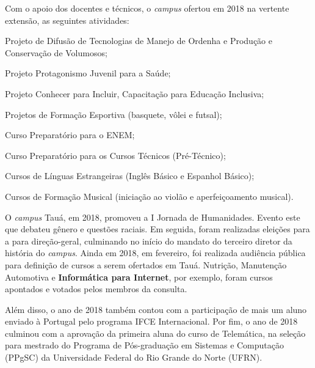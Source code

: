 \documentclass[
	12pt,				%
	openright,			%
	twoside,			%
	a4paper,			%
	chapter=TITLE,		%
	english,			%
	french,				%
	spanish,			%
	brazil,				%
	]{abntex2}
\begin{document}
Com o apoio dos docentes e técnicos, o \textit{campus} ofertou em 2018 na vertente extensão, as seguintes atividades:
\begin{alineas}
    \setlength\itemsep{0em}
    \item Projeto de Difusão de Tecnologias de Manejo de Ordenha e Produção e Conservação de Volumosos;
    \item  Projeto Protagonismo Juvenil para a Saúde;
    \item  Projeto Conhecer para Incluir, Capacitação para Educação Inclusiva;
    \item  Projetos de Formação Esportiva (basquete, vôlei e futsal);
    \item  Curso Preparatório para o ENEM;
    \item  Curso Preparatório para os Cursos Técnicos (Pré-Técnico);
    \item  Cursos de Línguas Estrangeiras (Inglês Básico e Espanhol Básico);
    \item  Cursos de Formação Musical (iniciação ao violão e aperfeiçoamento musical).
\end{alineas}

O \textit{campus} Tauá, em 2018, promoveu a I Jornada de Humanidades. Evento este que debateu  gênero e questões raciais. Em seguida, foram realizadas eleições para a para direção-geral, culminando no início do mandato do terceiro diretor da história do \textit{campus}. Ainda em 2018, em fevereiro, foi realizada audiência pública  para definição de cursos a serem ofertados em Tauá. Nutrição, Manutenção Automotiva e \textbf{Informática para Internet}, por exemplo, foram cursos  apontados e votados pelos membros da consulta. 

Além disso,  o ano de 2018 também contou com a participação de mais um aluno enviado à Portugal pelo programa  IFCE Internacional. Por fim, o ano de 2018 culminou com a aprovação da primeira aluna do curso de Telemática, na seleção para mestrado do Programa de Pós-graduação em Sistemas e Computação (PPgSC) da Universidade Federal do Rio Grande do Norte (UFRN).
\end{document}
